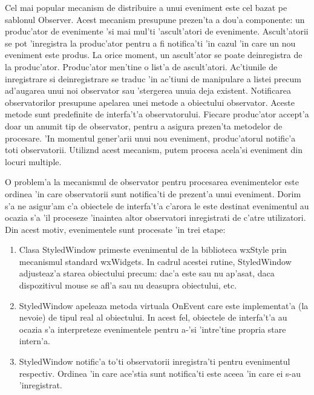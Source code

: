\medskip

Cel mai popular mecanism de distribuire a unui eveniment este cel bazat pe sablonul Observer. Acest mecanism presupune prezen'ta a dou'a componente: un produc'ator de evenimente 'si mai mul'ti 'ascult'atori de evenimente. Ascult'atorii se pot 'inregistra la produc'ator pentru a fi notifica'ti 'in cazul 'in care un nou eveniment este produs. La orice moment, un ascult'ator se poate deinregistra de la produc'ator. Produc'ator men'tine o list'a de ascult'atori. Ac'tiunile de inregistrare si deinregistrare se traduc 'in ac'tiuni de manipulare a listei precum ad'augarea unui noi observator sau 'stergerea unuia deja existent. Notificarea observatorilor presupune apelarea unei metode a obiectului observator. Aceste metode sunt predefinite de interfa't'a observatorului. Fiecare produc'ator accept'a doar un anumit tip de observator, pentru a asigura prezen'ta metodelor de procesare. 'In momentul gener'arii unui nou eveniment, produc'atorul notific'a toti observatorii. Utiliz{\ia}nd acest mecanism, putem procesa acela'si eveniment din locuri multiple.

\medskip

O problem'a la mecanismul de observator pentru procesarea evenimentelor este ordinea 'in care observatorii sunt notifica'ti de prezent'a unui eveniment. Dorim s'a ne asigur'am c'a obiectele de interfa't'a c'arora le este destinat evenimentul au ocazia s'a 'il proceseze 'inaintea altor observatori inregistrati de c'atre utilizatori. Din acest motiv, evenimentele sunt procesate 'in trei etape:

\begin{enumerate}
\item Clasa StyledWindow primeste evenimentul de la biblioteca wxStyle prin mecanismul standard wxWidgets. In cadrul acestei rutine, StyledWindow adjusteaz'a starea obiectului precum: dac'a este sau nu ap'asat, daca dispozitivul mouse se afl'a sau nu deasupra obiectului, etc.
\item StyledWindow apeleaza metoda virtuala On{Event} care este implementat'a (la nevoie) de tipul real al obiectului. In acest fel, obiectele de interfa't'a au ocazia s'a interpreteze evenimentele pentru a-'si 'intre'tine propria stare intern'a.
\item StyledWindow notific'a to'ti observatorii inregistra'ti pentru evenimentul respectiv. Ordinea 'in care ace'stia sunt notifica'ti este aceea 'in care ei s-au 'inregistrat.
\end{enumerate}

